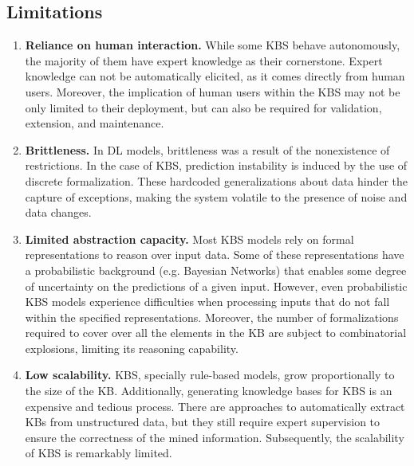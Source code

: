 \subsection{Limitations}
\begin{enumerate} [start=1,label={\bfseries L\arabic*.}]
    \item \textbf{Reliance on human interaction.} \label{dl_intro_kbs_L_human} While some KBS behave autonomously, the majority of them have expert knowledge as their cornerstone.  Expert knowledge can not be automatically elicited, as it comes directly from human users. Moreover, the implication of human users within the KBS may not be only limited to their deployment, but can also be required for validation, extension, and maintenance. 
    \item \textbf{Brittleness.}\label{dl_into_kbs_L_brittle} In DL models, brittleness was a result of the nonexistence of restrictions. In the case of KBS, prediction instability is induced by the use of discrete formalization. These hardcoded generalizations about data hinder the capture of exceptions, making the system volatile to the presence of noise and data changes.  
    \item \textbf{Limited abstraction capacity.}\label{dl_into_kbs_L_abstraction} Most KBS models rely on formal representations to reason over input data. Some of these representations have a probabilistic background (e.g. Bayesian Networks) that enables some degree of uncertainty on the predictions of a given input. However, even probabilistic KBS models experience difficulties when processing inputs that do not fall within the specified representations. Moreover, the number of formalizations required to cover over all the elements in the KB are subject to combinatorial explosions, limiting its reasoning capability.
    \item \textbf{Low scalability.}\label{dl_into_kbs_L_scalability} KBS, specially rule-based models, grow proportionally to the size of the KB. Additionally, generating knowledge bases for KBS is an expensive and tedious process. There are approaches to automatically extract KBs from unstructured data, but they still require expert supervision to ensure the correctness of the mined information. Subsequently, the scalability of KBS is remarkably limited.  
\end{enumerate}

